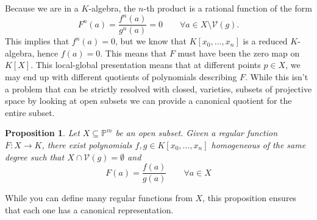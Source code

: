 \documentclass[40pt]{article}
\newcommand{\Proj}{\mathbb{P}}
\newcommand{\V}{\mathcal{V}}
\newtheorem{proposition}{Proposition}[section]
\theoremstyle{remark}
\begin{document}
				Because we are in a $K$-algebra, the $n$-th product is a rational function of the form 
				\[
				F^n(a) = \frac{f^n(a)}{g^n(a)} = 0 \quad\quad \forall a \in X \setminus \V(g).
				\]
				This implies that $f^n(a) = 0$, but we know that $K[x_0,\dots,x_n]$ is a reduced $K$-algebra, hence $f(a) = 0$. This means that $F$ must have been the zero map on $K[X]$. This local-global presentation means that at different points $p \in X$, we may end up with different quotients of polynomials describing $F$. While this isn't a problem that can be strictly resolved with closed, varieties, subsets of projective space by looking at open subsets we can provide a canonical quotient for the entire subset. 
				\begin{proposition}
					Let $X \subseteq \Proj^m$ be an open subset. Given a regular function $F:X \to K$, there exist polynomials $f,g \in K[x_0,\dots,x_n]$ homogeneous of the same degree such that $X \cap \V(g) = \emptyset$ and 
					\[
					F(a) = \frac{f(a)}{g(a)} \quad\quad \forall a \in X
					\]
				\end{proposition}
				While you can define many regular functions from $X$, this proposition ensures that each one has a canonical representation.
\end{document}
